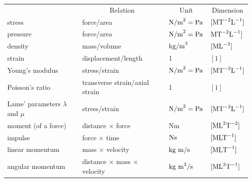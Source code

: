 \documentclass[graybox,envcountchap,sectrefs,final]{svmonodo}
\begin{document}
{\small   %

\vspace{4mm}

\begin{tabular}{llll}
\hline\noalign{\smallskip}
\multicolumn{1}{c}{ Quantity } & \multicolumn{1}{c}{ Relation } & \multicolumn{1}{c}{ Unit } & \multicolumn{1}{c}{ Dimension } \\
\noalign{\smallskip}\svhline\noalign{\smallskip}
stress                               & force/area                               & $\hbox{N/m}^2 = \hbox{Pa}$     & $[\hbox{M}\hbox{T}^{-2}\hbox{L}^{-1}]$  \\
pressure                             & force/area                               & $\hbox{N/m}^2 = \hbox{Pa}$     & $\hbox{M}\hbox{T}^{-2}\hbox{L}^{-1}]$   \\
density                              & mass/volume                              & $\hbox{kg/m}^3$                & $[\hbox{ML}^{-3}]$                      \\
strain                               & displacement/length                      & 1                              & $[1]$                                   \\
Young's modulus                      & stress/strain                            & $\hbox{N/m}^2 = \hbox{Pa}$     & $[\hbox{M}\hbox{T}^{-2}\hbox{L}^{-1}]$  \\
Poisson's ratio                      & transverse strain/axial strain           & 1                              & $[1]$                                   \\
Lame' parameters $\lambda$ and $\mu$ & stress/strain                            & $\hbox{N/m}^2 = \hbox{Pa}$     & $[\hbox{M}\hbox{T}^{-2}\hbox{L}^{-1}]$  \\
moment (of a force)                  & distance $\times$ force                  & Nm                             & $[\hbox{ML}^2\hbox{T}^{-2}]$            \\
impulse                              & force $\times$ time                      & $\hbox{Ns}$                    & $[\hbox{MLT}^{-1}]$                     \\
linear momentum                      & mass $\times$ velocity                   & $\hbox{kg m/s}$                & $[\hbox{ML}\hbox{T}^{-1}]$              \\
angular momentum                     & distance $\times$ mass $\times$ velocity & $\hbox{kg m}^2/\hbox{s}$       & $[\hbox{ML}^2\hbox{T}^{-1}]$            \\

\end{tabular}}
\end{document}
